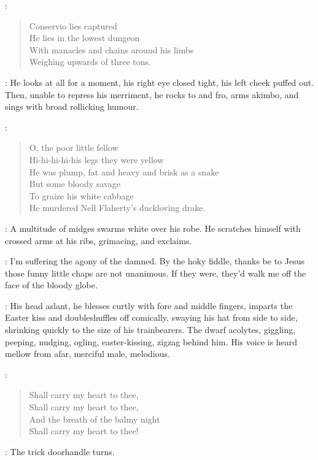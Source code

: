 \Cardinal:
\begin{verse}
    Conservio lies captured\\
    He lies in the lowest dungeon\\
    With manacles and chains around his limbs\\
    Weighing upwards of three tons.
\end{verse}

:
He looks at all for a moment, his right eye closed tight, his left cheek puffed out.
Then, unable to repress his merriment, he rocks to and fro,
arms akimbo, and sings with broad rollicking humour.

\Cardinal:
\begin{verse}
    O, the poor little fellow\\
    Hi-hi-hi-hi-his legs they were yellow\\
    He was plump, fat and heavy and brisk as a snake\\
    But some bloody savage\\
    To graize his white cabbage\\
    He murdered Nell Flaherty's duckloving drake.
\end{verse}

:
A multitude of midges swarms white over his robe.
He scratches himself with crossed arms at his ribs, grimacing, and exclaims.

\Cardinal:
I'm suffering the agony of the damned.
By the hoky fiddle, thanks be to Jesus those funny little chaps are not unanimous.
If they were, they'd walk me off the face of the bloody globe.

:
His head aslant, he blesses curtly with fore and middle fingers,
imparts the Easter kiss and doubleshuffles off comically,
swaying his hat from side to side,
shrinking quickly to the size of his trainbearers.
The dwarf acolytes, giggling, peeping, nudging,
ogling, easter-kissing, zigzag behind him.
His voice is heard mellow from afar, merciful male, melodious.

\Cardinal:
\begin{verse}
    Shall carry my heart to thee,\\
    Shall carry my heart to thee,\\
%
    And the breath of the balmy night\\
    Shall carry my heart to thee!
\end{verse}

:
The trick doorhandle turns.

